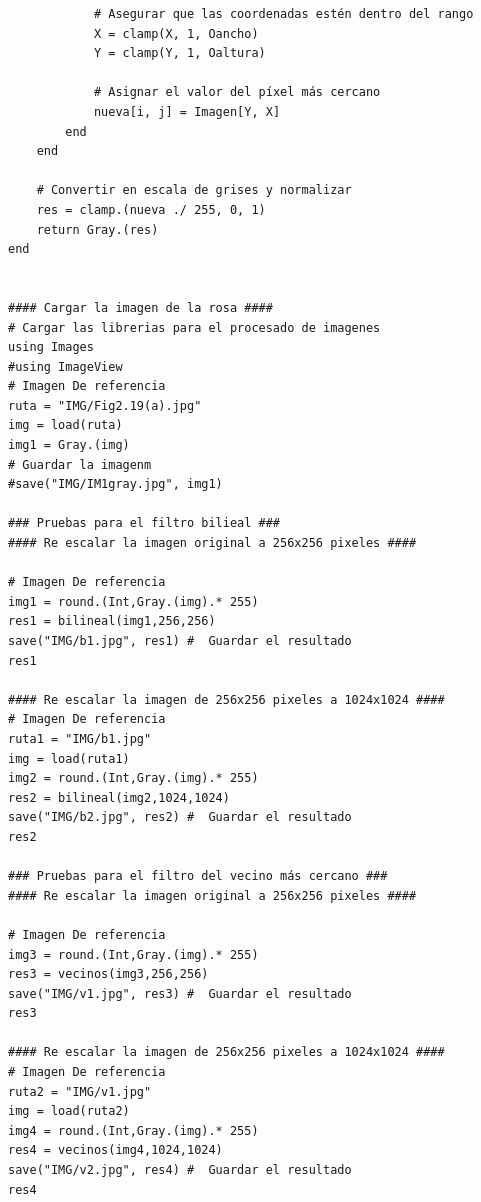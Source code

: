 \documentclass[11pt, letterpaper]{article}
\begin{document}
\begin{itemize}
\begin{verbatim}
			# Asegurar que las coordenadas estén dentro del rango
			X = clamp(X, 1, Oancho)
			Y = clamp(Y, 1, Oaltura)
			
			# Asignar el valor del píxel más cercano
			nueva[i, j] = Imagen[Y, X]
		end
	end
	
	# Convertir en escala de grises y normalizar
	res = clamp.(nueva ./ 255, 0, 1)
	return Gray.(res)
end


#### Cargar la imagen de la rosa ####
# Cargar las librerias para el procesado de imagenes
using Images
#using ImageView
# Imagen De referencia
ruta = "IMG/Fig2.19(a).jpg"
img = load(ruta)
img1 = Gray.(img)
# Guardar la imagenm
#save("IMG/IM1gray.jpg", img1)

### Pruebas para el filtro bilieal ###
#### Re escalar la imagen original a 256x256 pixeles ####

# Imagen De referencia
img1 = round.(Int,Gray.(img).* 255)
res1 = bilineal(img1,256,256)
save("IMG/b1.jpg", res1) #  Guardar el resultado
res1

#### Re escalar la imagen de 256x256 pixeles a 1024x1024 ####
# Imagen De referencia
ruta1 = "IMG/b1.jpg"
img = load(ruta1)
img2 = round.(Int,Gray.(img).* 255)
res2 = bilineal(img2,1024,1024)
save("IMG/b2.jpg", res2) #  Guardar el resultado
res2

### Pruebas para el filtro del vecino más cercano ###
#### Re escalar la imagen original a 256x256 pixeles ####

# Imagen De referencia
img3 = round.(Int,Gray.(img).* 255)
res3 = vecinos(img3,256,256)
save("IMG/v1.jpg", res3) #  Guardar el resultado
res3

#### Re escalar la imagen de 256x256 pixeles a 1024x1024 ####
# Imagen De referencia
ruta2 = "IMG/v1.jpg"
img = load(ruta2)
img4 = round.(Int,Gray.(img).* 255)
res4 = vecinos(img4,1024,1024)
save("IMG/v2.jpg", res4) #  Guardar el resultado
res4
	\end{verbatim}
\end{itemize}
	
	
	
	
	
	
	
	
\end{document}
